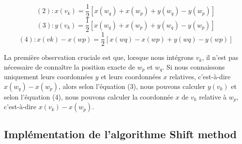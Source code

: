 \documentclass[hidelinks,letterpaper,12pt]{article}
\begin{document}
\[ (2) : x(v_k) = \frac{1}{2} [ x(w_q) + x(w_p) + y(w_q) − y(w_p)] \]
\[ (3) : y(v_k) = \frac{1}{2} [ x(w_q) + x(w_p) + y(w_q) − y(w_p)] \]
\[ (4) : x(vk )-x(wp) = \frac{1}{2} [ x(wq) − x (wp) + y(wq) - y(wp)] \]

La première observation cruciale est que, lorsque nous intégrons $v_k$, il n'est pas nécessaire de connaître la position exacte de $w_p$ et $w_q$. Si nous connaissons uniquement leurs coordonnées $y$ et leurs coordonnées $x$ relatives, c'est-à-dire 
\(x(w_q) - x(w_p)\), alors selon l'équation (3), nous pouvons calculer $y(v_k)$ et selon l'équation (4), nous pouvons calculer la coordonnée $x$ de $v_k$ relative à $w_p$, c'est-à-dire $x(v_k) - x(w_p)$.

\subsection{Implémentation de l'algorithme Shift method}
\end{document}
